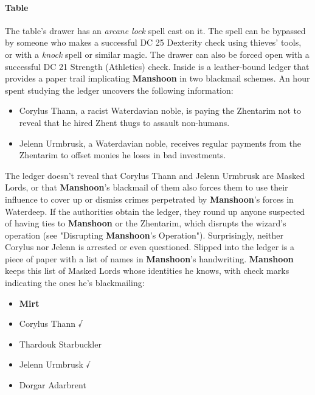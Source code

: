 \documentclass[10pt,a4paper,twoside,twocolumn,openany,nodeprecatedcode]{dndbook}
\begin{document}
\paragraph{Table}
The table's drawer has an \textit{arcane lock} spell cast on it. The spell can be bypassed by someone who makes a successful DC 25 Dexterity check using thieves' tools, or with a \textit{knock} spell or similar magic. The drawer can also be forced open with a successful DC 21 Strength (Athletics) check. Inside is a leather-bound ledger that provides a paper trail implicating \textbf{Manshoon} in two blackmail schemes. An hour spent studying the ledger uncovers the following information:
\begin{itemize}

\item Corylus Thann, a racist Waterdavian noble, is paying the Zhentarim not to reveal that he hired Zhent thugs to assault non-humans.
\item Jelenn Urmbrusk, a Waterdavian noble, receives regular payments from the Zhentarim to offset monies he loses in bad investments.
\end{itemize}


The ledger doesn't reveal that Corylus Thann and Jelenn Urmbrusk are Masked Lords, or that \textbf{Manshoon}'s blackmail of them also forces them to use their influence to cover up or dismiss crimes perpetrated by \textbf{Manshoon}'s forces in Waterdeep. If the authorities obtain the ledger, they round up anyone suspected of having ties to \textbf{Manshoon} or the Zhentarim, which disrupts the wizard's operation (see "Disrupting \textbf{Manshoon}'s Operation"). Surprisingly, neither Corylus nor Jelenn is arrested or even questioned.
Slipped into the ledger is a piece of paper with a list of names in \textbf{Manshoon}'s handwriting. \textbf{Manshoon} keeps this list of Masked Lords whose identities he knows, with check marks indicating the ones he's blackmailing:
\begin{DndComment}{}
\begin{itemize}

\item \textbf{Mirt}
\item Corylus Thann √
\item Thardouk Starbuckler
\item Jelenn Urmbrusk √
\item Dorgar Adarbrent
\end{itemize}


\end{DndComment}
\end{document}
